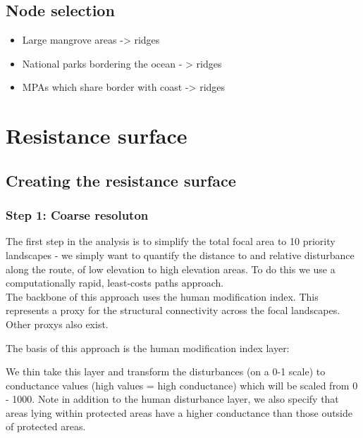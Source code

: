 \documentclass[
]{book}
\providecommand{\tightlist}{%
  \setlength{\itemsep}{0pt}\setlength{\parskip}{0pt}}
\begin{document}
\hypertarget{node-selection}{%
\section{Node selection}\label{node-selection}}

\begin{itemize}
\tightlist
\item
  Large mangrove areas -\textgreater{} ridges
\item
  National parks bordering the ocean - \textgreater{} ridges
\item
  MPAs which share border with coast -\textgreater{} ridges
\end{itemize}

\hypertarget{resistance-surface-1}{%
\chapter{Resistance surface}\label{resistance-surface-1}}

\hypertarget{creating-the-resistance-surface}{%
\section{Creating the resistance surface}\label{creating-the-resistance-surface}}

\hypertarget{step-1-coarse-resoluton}{%
\subsection{Step 1: Coarse resoluton}\label{step-1-coarse-resoluton}}

The first step in the analysis is to simplify the total focal area to 10 priority landscapes - we simply want to quantify the distance to and relative disturbance along the route, of low elevation to high elevation areas. To do this we use a computationally rapid, least-costs paths approach.\\
The backbone of this approach uses the human modification index. This represents a proxy for the structural connectivity across the focal landscapes. Other proxys also exist.

The basis of this approach is the human modification index layer:

We thin take this layer and transform the disturbances (on a 0-1 scale) to conductance values (high values = high conductance) which will be scaled from 0 - 1000. Note in addition to the human disturbance layer, we also specify that areas lying within protected areas have a higher conductance than those outside of protected areas.
\end{document}
